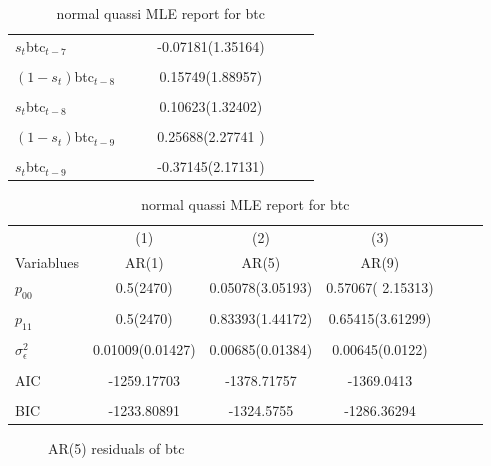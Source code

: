 \documentclass{article}
\begin{document}
\begin{table}[h!]
\begin{center}
\begin{tabular}{lcccccc}
      \\
      $s_t$btc$_{t-7}$ & & & -0.07181(1.35164) \\
      \\
      $(1-s_t)$btc$_{t-8}$ & & & 0.15749(1.88957)  \\
      \\
      $s_t$btc$_{t-8}$ & & &  0.10623(1.32402) \\
      \\
      $(1-s_t)$btc$_{t-9}$ & & & 0.25688(2.27741 )  \\
      \\
      $s_t$btc$_{t-9}$ & & & -0.37145(2.17131) \\
      \hline
    \end{tabular}
    \caption{normal quassi MLE report for btc}
  \end{center}
  \end{table}

\newpage

\begin{table}[h!]
  \begin{center}
    \begin{tabular}{lcccccc}
       & (1) & (2) & (3) \\
      Variablues & AR(1) & AR(5) & AR(9)  \\
      \hline
      $p_{00}$ & 0.5(2470) &  0.05078(3.05193) & 0.57067( 2.15313) \\
      \\
      $p_{11}$ &  0.5(2470) &  0.83393(1.44172) &  0.65415(3.61299) \\
      \\
      $\sigma_{\epsilon}^2$ & 0.01009(0.01427)  &  0.00685(0.01384) & 0.00645(0.0122)\\
      \\
      AIC & -1259.17703 & -1378.71757 & -1369.0413 \\
      \\
      BIC & -1233.80891 & -1324.5755 & -1286.36294 \\
      \hline
    \end{tabular}
    \caption{normal quassi MLE report for btc}
  \end{center}
  \end{table}

  \begin{figure}[h!]
    \centering
    
    \caption{AR(5) residuals of btc}
  \end{figure}
\end{document}
